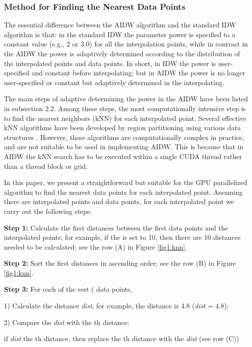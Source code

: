 \documentclass[fleqn,11pt]{wlscirep}
\begin{document}
\subsubsection{Method for Finding the Nearest Data Points}

The essential difference between the AIDW algorithm and the standard IDW 
algorithm is that: in the standard IDW the parameter power  is 
specified to a constant value (e.g., 2 or 3.0) for all the interpolation 
points, while in contrast in the AIDW the power  is adaptively 
determined according to the distribution of the interpolated points and data 
points. In short, in IDW the power  is user-specified and constant 
before interpolating; but in AIDW the power  is no longer 
user-specified or constant but adaptively determined in the interpolating. 

The main steps of adaptive determining the power  in the AIDW have 
been listed in subsection 2.2. Among these steps, the most computationally 
intensive step is to find the  nearest neighbors (kNN) for each interpolated 
point. Several effective kNN algorithms have been developed by region 
partitioning using various data structures \cite{20,33,34,35}. However, these 
algorithms are computationally complex in practice, and are not suitable to 
be used in implementing AIDW. This is because that in AIDW the kNN search 
has to be executed within a single CUDA thread rather than a thread block or 
grid. 

In this paper, we present a straightforward but suitable for the GPU 
parallelized algorithm to find the  nearest data points for each 
interpolated point. Assuming there are  interpolated points and  data 
points, for each interpolated point we carry out the following steps:

\textbf{Step 1:} Calculate the first  distances between the first  data points and 
the interpolated points; for example, if the  is set to 10, then there are 
10 distances needed to be calculated; see the row (A) in Figure \ref{fig1:knn}.

\textbf{Step 2:} Sort the first  distances in ascending order; see the row (B) in 
Figure \ref{fig1:knn}.

\textbf{Step 3:} For each of the rest ( data points, 

1) Calculate the distance \textit{dist}, for example, the distance is 4.8 (\textit{dist} = 4.8);

2) Compare the \textit{dist} with the th distance:

if \textit{dist}  the th distance, then replace the th distance with the \textit{dist} (see row 
(C))
\end{document}
